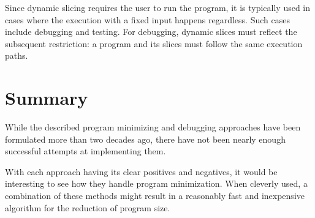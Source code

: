 Since dynamic slicing requires the user to run the program, 
it is typically used in cases where the execution with a fixed 
input happens regardless. Such cases include debugging and testing. 
For debugging, dynamic slices must reflect the subsequent restriction: 
a program and its slices must follow the same execution paths.

\section{Summary}

While the described program minimizing and debugging approaches have been 
formulated more than two decades ago, there have not been nearly enough 
successful attempts at implementing them. 

With each approach having its clear positives and negatives, 
it would be interesting to see how they handle program minimization. 
When cleverly used, a combination of these methods might 
result in a reasonably fast and inexpensive algorithm 
for the reduction of program size.
